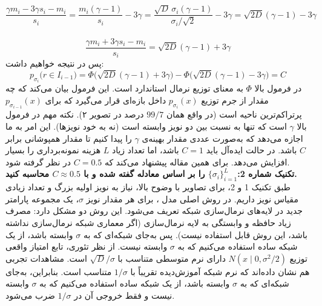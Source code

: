 \documentclass[12pt]{article}
\begin{document}
\begin{enumerate}
\begin{enumerate}
{        \paragraph{}
        $$
        \frac{\gamma m_i - 3\gamma s_i - m_i}{s_i} 
        = \frac{m_i(\gamma - 1)}{s_i} - 3\gamma
        = \frac{\sqrt{D}\,\sigma_i (\gamma - 1)}{\sigma_i/\sqrt{2}} - 3\gamma
        = \sqrt{2D}(\gamma - 1) - 3\gamma
        $$
        \paragraph{}
        $$
        \frac{\gamma m_i + 3\gamma s_i - m_i}{s_i} 
        = \sqrt{2D}(\gamma - 1) + 3\gamma
        $$
        پس در نتیجه خواهیم داشت:
        $$
        p_{\sigma_i}\big(r \in I_{i-1}\big) 
        = \Phi\big(\sqrt{2D}(\gamma - 1) + 3\gamma\big) 
        - \Phi\big(\sqrt{2D}(\gamma - 1) - 3\gamma\big) 
        = C
        $$
        در فرمول بالا $\Phi$ به معنای  توزیع نرمال استاندارد است.  
        این فرمول بیان می‌کند که چه مقدار از جرم توزیع $p_{\sigma_i}(x)$ داخل بازه‌ای قرار می‌گیرد که برای $p_{\sigma_{i-1}}(x)$ پرتراکم‌ترین ناحیه است (در واقع همان $99/7$ درصد در تصویر ۲). 
        نکته مهم در فرمول بالا $\gamma$ است که تنها به نسبت بین دو نویز وابسته است (نه به خود نویزها). این امر به ما اجازه می‌دهد که به‌صورت عددی مقدار بهینه‌ی $\gamma$ را پیدا کنیم تا مقدار همپوشانی برابر $C$ باشد.  
        در حالت ایده‌آل باید $C=1$ باشد، اما تعداد زیاد $L$ هزینه نمونه‌برداری را بسیار افزایش می‌دهد.  
        برای همین مقاله پیشنهاد می‌کند که $C = 0.5$ در نظر گرفته شود.\\
        \textbf{تکنیک شماره 2:$\{\sigma_i\}_{i=1}^{L}$  را بر اساس معادله گفته شده و با  $C \approx 0.5$  محاسبه کنید.}\\
        طبق تکنیک 1 و 2، برای تصاویر با وضوح بالا، نیاز به نویز اولیه بزرگ و تعداد زیادی مقیاس نویز داریم. در روش اصلی مدل ، برای هر مقدار نویز $\sigma$، یک مجموعه پارامتر جدید در لایه‌های نرمال‌سازی شبکه تعریف می‌شود. این روش دو مشکل دارد: مصرف زیاد حافظه و وابستگی به لایه نرمال‌سازی (اگر معماری شبکه نرمال‌سازی نداشته باشد، این روش قابل استفاده نیست).  
        پس به‌جای شبکه‌ای که به $\sigma$ وابسته باشد، از یک شبکه ساده استفاده می‌کنیم که به $\sigma$ وابسته نیست.  
        از نظر تئوری، تابع امتیاز واقعی توزیع $N(x \mid 0, \sigma^2/2)$ دارای نرم متوسطی متناسب با $\sqrt{D}/\sigma$ است. مشاهدات تجربی هم نشان داده‌اند که نرم شبکه آموزش‌دیده تقریباً با $1/\sigma$ متناسب است. بنابراین، به‌جای شبکه‌ای که به $\sigma$ وابسته باشد، از یک شبکه ساده استفاده می‌کنیم که به $\sigma$ وابسته نیست و فقط خروجی آن در $1/\sigma$ ضرب می‌شود.\\  
}
\end{enumerate}
\end{enumerate}
\end{document}

